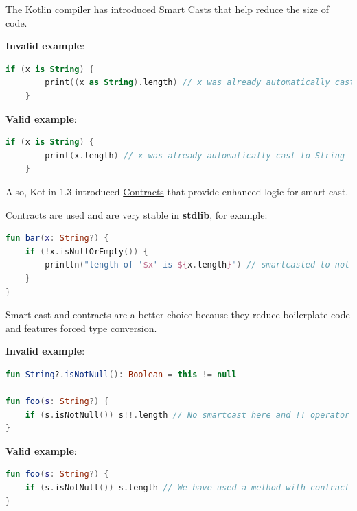 \label{sec:4.2.1}



The Kotlin compiler has introduced \href{https://kotlinlang.org/docs/reference/typecasts.html#smart-casts}{Smart Casts} that help reduce the size of code.



\textbf{Invalid example}:

\begin{lstlisting}[language=Kotlin]
    if (x is String) {
        print((x as String).length) // x was already automatically cast to String - no need to use 'as' keyword here
    }
\end{lstlisting}


\textbf{Valid example}:

\begin{lstlisting}[language=Kotlin]
    if (x is String) {
        print(x.length) // x was already automatically cast to String - no need to use 'as' keyword here
    }
\end{lstlisting}


Also, Kotlin 1.3 introduced \href{https://kotlinlang.org/docs/reference/whatsnew13.html#contracts}{Contracts} that provide enhanced logic for smart-cast.

Contracts are used and are very stable in \textbf{stdlib}, for example:

 



\begin{lstlisting}[language=Kotlin]
fun bar(x: String?) {
    if (!x.isNullOrEmpty()) {
        println("length of '$x' is ${x.length}") // smartcasted to not-null
    }
} 
\end{lstlisting}


Smart cast and contracts are a better choice because they reduce boilerplate code and features forced type conversion.



\textbf{Invalid example}:

\begin{lstlisting}[language=Kotlin]
fun String?.isNotNull(): Boolean = this != null

fun foo(s: String?) {
    if (s.isNotNull()) s!!.length // No smartcast here and !! operator is used
}
\end{lstlisting}


\textbf{Valid example}:

\begin{lstlisting}[language=Kotlin]
fun foo(s: String?) {
    if (s.isNotNull()) s.length // We have used a method with contract from stdlib that helped compiler to execute smart cast
}
\end{lstlisting}


